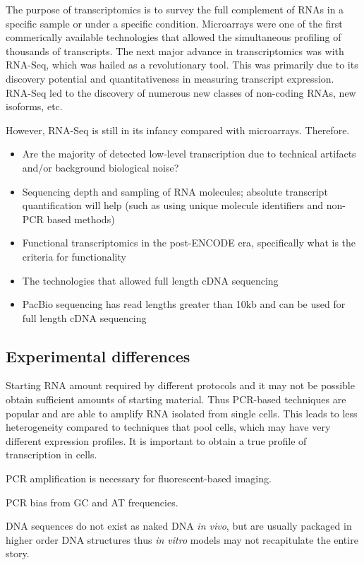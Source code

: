 The purpose of transcriptomics is to survey the full complement of RNAs in a specific sample or under a specific condition. Microarrays were one of the first commerically available technologies that allowed the simultaneous profiling of thousands of transcripts. The next major advance in transcriptomics was with RNA-Seq, which was hailed as a revolutionary tool\cite{pmid19015660}. This was primarily due to its discovery potential and quantitativeness in measuring transcript expression. RNA-Seq led to the discovery of numerous new classes of non-coding RNAs, new isoforms, etc.

However, RNA-Seq is still in its infancy compared with microarrays. Therefore.

\begin{itemize}
   \item Are the majority of detected low-level transcription due to technical artifacts and/or background biological noise?
   \item Sequencing depth and sampling of RNA molecules; absolute transcript quantification will help (such as using unique molecule identifiers and non-PCR based methods)
   \item Functional transcriptomics in the post-ENCODE era, specifically what is the criteria for functionality
   \item The technologies that allowed full length cDNA sequencing
   \item PacBio sequencing has read lengths greater than 10kb and can be used for full length cDNA sequencing
\end{itemize}

\subsection{Experimental differences}

Starting RNA amount required by different protocols and it may not be possible obtain sufficient amounts of starting material. Thus PCR-based techniques are popular and are able to amplify RNA isolated from single cells. This leads to less heterogeneity compared to techniques that pool cells, which may have very different expression profiles. It is important to obtain a true profile of transcription in cells.

PCR amplification is necessary for fluorescent-based imaging.

PCR bias from GC and AT frequencies.

DNA sequences do not exist as naked DNA \textit{in vivo}, but are usually packaged in higher order DNA structures thus \textit{in vitro} models may not recapitulate the entire story.

